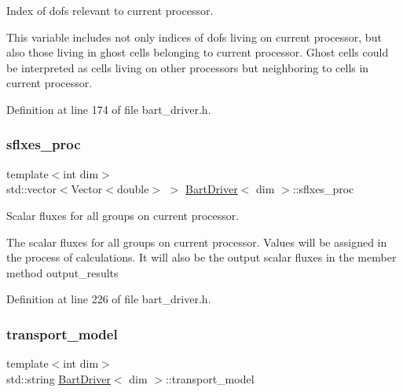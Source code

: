 Index of dofs relevant to current processor. 

This variable includes not only indices of dofs living on current processor, but also those living in ghost cells belonging to current processor. Ghost cells could be interpreted as cells living on other processors but neighboring to cells in current processor. 

Definition at line 174 of file bart\+\_\+driver.\+h.

\mbox{\label{class_bart_driver_a560ae94f3801fb64a35fdbcd0d8a772d}} 
\subsubsection{\texorpdfstring{sflxes\+\_\+proc}{sflxes\_proc}}
{\footnotesize\ttfamily template$<$int dim$>$ \\
std\+::vector$<$Vector$<$double$>$ $>$ \hyperlink{class_bart_driver}{Bart\+Driver}$<$ dim $>$\+::sflxes\+\_\+proc\hspace{0.3cm}{\ttfamily [private]}}



Scalar fluxes for all groups on current processor. 

The scalar fluxes for all groups on current processor. Values will be assigned in the process of calculations. It will also be the output scalar fluxes in the member method output\+\_\+results 

Definition at line 226 of file bart\+\_\+driver.\+h.

\mbox{\label{class_bart_driver_a736f40f99459dc715fdb174e06626f55}} 
\subsubsection{\texorpdfstring{transport\+\_\+model}{transport\_model}}
{\footnotesize\ttfamily template$<$int dim$>$ \\
std\+::string \hyperlink{class_bart_driver}{Bart\+Driver}$<$ dim $>$\+::transport\+\_\+model\hspace{0.3cm}{\ttfamily [private]}}



